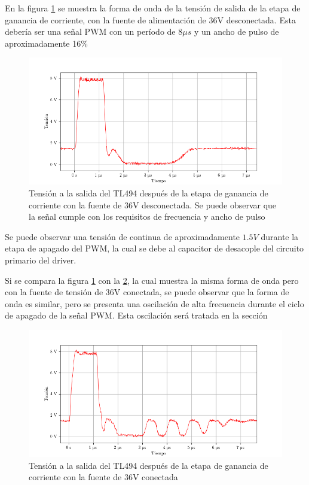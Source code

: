 En la figura \ref{fig:osc_pwm_vout_disconnected} se muestra la forma de onda de la tensión de salida de la etapa de ganancia de corriente, con la fuente de alimentación de 36V desconectada.
Esta debería ser una señal PWM con un período de $8\mu s$ y un ancho de pulso de aproximadamente 16\%

\begin{figure}[H]
    \centering
    \includegraphics[width=\textwidth]{images/capturas-osciloscopio/TL494/pwm_vout_disconnected.png}
    \caption{Tensión a la salida del TL494 después de la etapa de ganancia de corriente con la fuente de 36V desconectada. Se puede observar que la señal cumple con los requisitos de frecuencia y ancho de pulso}
    \label{fig:osc_pwm_vout_disconnected}
\end{figure}

Se puede observar una tensión de continua de aproximadamente $1.5V$ durante la etapa de apagado del PWM, la cual se debe al capacitor de desacople del circuito primario del driver.

Si se compara la figura \ref{fig:osc_pwm_vout_disconnected} con la \ref{fig:osc_pwm_vout_connected}, la cual muestra la misma forma de onda pero con la fuente de tensión de 36V conectada, se puede observar que la forma de onda es similar, pero se presenta una oscilación de alta frecuencia durante el ciclo de apagado de la señal PWM. Esta oscilación será tratada en la sección %

\begin{figure}[H]
    \centering
    \includegraphics[width=\textwidth]{images/capturas-osciloscopio/TL494/pwm_vout_connected.png}
    \caption{Tensión a la salida del TL494 después de la etapa de ganancia de corriente con la fuente de 36V conectada}
    \label{fig:osc_pwm_vout_connected}
\end{figure}

